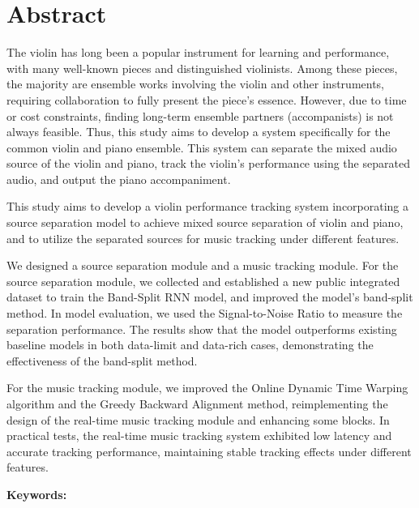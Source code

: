 \documentclass[class=NCU_thesis, crop=false]{standalone}
\begin{document}
\chapter{Abstract}

The violin has long been a popular instrument for learning and performance, 
with many well-known pieces and distinguished violinists. 
Among these pieces, the majority are ensemble works involving the violin and other instruments, 
requiring collaboration to fully present the piece's essence. 
However, due to time or cost constraints, 
finding long-term ensemble partners (accompanists) is not always feasible. 
Thus, this study aims to develop a system specifically 
for the common violin and piano ensemble. 
This system can separate the mixed audio source of the violin and piano, 
track the violin's performance using the separated audio, 
and output the piano accompaniment.

This study aims to develop a violin performance tracking system 
incorporating a source separation model to achieve mixed source separation 
of violin and piano, 
and to utilize the separated sources for music tracking under different features.

We designed a source separation module and a music tracking module. 
For the source separation module, 
we collected and established a new public integrated dataset to train the Band-Split RNN model, 
and improved the model's band-split method. 
In model evaluation, we used the Signal-to-Noise Ratio 
to measure the separation performance.
The results show that the model outperforms existing baseline models 
in both data-limit and data-rich cases, 
demonstrating the effectiveness of the band-split method.

For the music tracking module, 
we improved the Online Dynamic Time Warping algorithm and 
the Greedy Backward Alignment method, 
reimplementing the design of the real-time music tracking module and 
enhancing some blocks. 
In practical tests, the real-time music tracking system exhibited 
low latency and accurate tracking performance, 
maintaining stable tracking effects under different features.

\vspace{2em}
\noindent \textbf{Keywords:} \keywordsEn{} %
\end{document}
